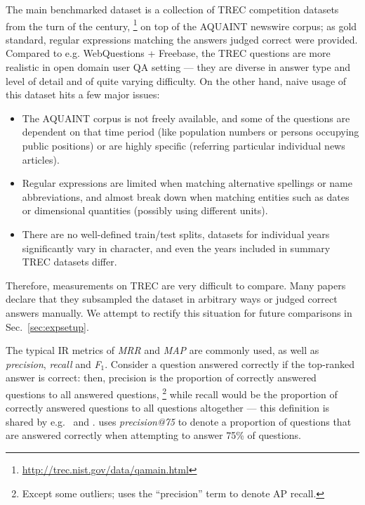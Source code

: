The main benchmarked dataset is a collection of TREC competition datasets
from the turn of the century,%
\footnote{\url{http://trec.nist.gov/data/qamain.html}}
on top of the AQUAINT newswire corpus;
as gold standard,
regular expressions matching the answers judged correct were provided.
Compared to e.g. WebQuestions + Freebase, the TREC questions
are more realistic in open domain user QA setting --- they are diverse
in answer type and level of detail and of quite varying difficulty.
On the other hand, naive usage of this dataset hits a few major issues:

\begin{itemize}
	\item The AQUAINT corpus is not freely available, and some of the questions are dependent on that time period (like population numbers or persons occupying public positions) or are highly specific (referring particular individual news articles).
	\item Regular expressions are limited when matching alternative spellings or name abbreviations, and almost break down when matching entities such as dates or dimensional quantities (possibly using different units).
	\item There are no well-defined train/test splits, datasets for individual years significantly vary in character, and even the years included in summary TREC datasets differ.
\end{itemize}

Therefore, measurements on TREC are very difficult to compare.  Many papers
declare that they subsampled the dataset in arbitrary ways or judged correct
answers manually.  We attempt to rectify this situation for future comparisons
in Sec.~\ref{sec:expsetup}.

The typical IR metrics of \textit{MRR} and \textit{MAP} are commonly
used, as well as \textit{precision}, \textit{recall} and \textit{F$_1$}.
Consider a question answered correctly if the top-ranked answer is correct:
then, precision is the proportion of correctly answered questions to all
answered questions,%
\footnote{Except some outliers; \cite{Ephyra2006} uses the ``precision'' term
	to denote AP recall.}
while recall would be the proportion of correctly answered questions to all
questions altogether --- this definition is shared by
e.g.\ \cite{TreeEdit2013Yao} and \cite{QuASE}.
\cite{WatsonOverview} uses \textit{precision@75} to denote a proportion
of questions that are answered correctly when attempting to answer 75\% of questions.

